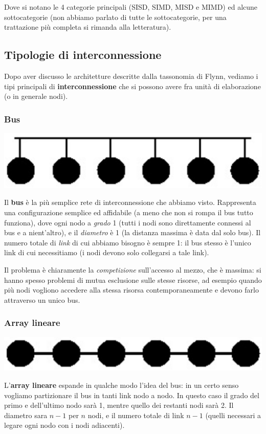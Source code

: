 \documentclass[a4paper,11pt]{article}
\begin{document}
Dove si notano le 4 categorie principali (SISD, SIMD, MISD e MIMD) ed alcune sottocategorie (non abbiamo parlato di tutte le sottocategorie, per una trattazione più completa si rimanda alla letteratura).

\subsection{Tipologie di interconnessione}
Dopo aver discusso le architetture descritte dalla tassonomia di Flynn, vediamo i tipi principali di \textbf{interconnessione} che si possono avere fra unità di elaborazione (o in generale nodi).

\subsubsection{Bus}
\begin{center}
	\includegraphics[scale=0.11]{../figures/bus.png}
\end{center}
Il \textbf{bus} è la più semplice rete di interconnessione che abbiamo visto.
Rappresenta una configurazione semplice ed affidabile (a meno che non si rompa il bus tutto funziona), dove ogni nodo a \textit{grado} 1 (tutti i nodi sono direttamente connessi al bus e a nient'altro), e il \textit{diametro} è 1 (la distanza massima è data dal solo bus).
Il numero totale di \textit{link} di cui abbiamo bisogno è sempre 1: il bus stesso è l'unico link di cui necessitiamo (i nodi devono solo collegarsi a tale link).

Il problema è chiaramente la \textit{competizione} sull'accesso al mezzo, che è massima: si hanno spesso problemi di mutua esclusione sulle stesse risorse, ad esempio quando più nodi vogliono accedere alla stessa risorsa contemporaneamente e devono farlo attraverso un unico bus.

\newpage

\subsubsection{Array lineare}
\begin{center}
	\includegraphics[scale=0.11]{../figures/linear.png}
\end{center}
L'\textbf{array lineare} espande in qualche modo l'idea del bus: in un certo senso vogliamo partizionare il bus in tanti link nodo a nodo. In questo caso il grado del primo e dell'ultimo nodo sarà 1, mentre quello dei restanti nodi sarà 2. Il diametro sara $n - 1$ per $n$ nodi, e il numero totale di link $n - 1$ (quelli necessari a legare ogni nodo con i nodi adiacenti).
\end{document}
